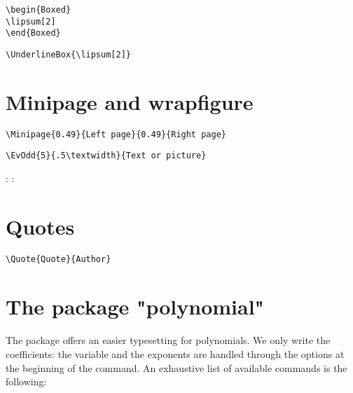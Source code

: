 \begin{verbatim}
\begin{Boxed}
\lipsum[2]
\end{Boxed}
\end{verbatim}
\begin{Boxed}
\lipsum[2]
\end{Boxed}

\newpage
\begin{verbatim}
\UnderlineBox{\lipsum[2]}
\end{verbatim}
\UnderlineBox{\lipsum[2]}


\section{Minipage and wrapfigure}
\begin{verbatim}
\Minipage{0.49}{Left page}{0.49}{Right page}
\end{verbatim}

\begin{verbatim}
\EvOdd{5}{.5\textwidth}{Text or picture}
\end{verbatim}

: :
\lipsum[2]

\newpage
\section{Quotes}
\begin{verbatim}
\Quote{Quote}{Author}
\end{verbatim}





\section{The package "polynomial"}
\paragraph*{}
The package  offers an easier typesetting for polynomials. We only write the coefficients: the variable and the exponents are handled through the options at the beginning of the command. An exhaustive list of available commands is the following:

